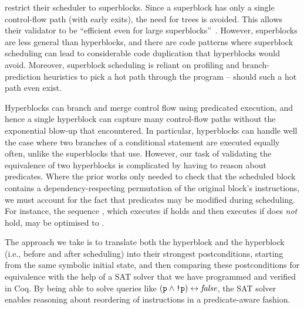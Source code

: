 \citeauthor{six22_formal_verif_super_sched} restrict their scheduler to superblocks. Since a superblock has only a single control-flow path (with early exits), the need for trees is avoided. This allows their validator to be ``efficient even for large superblocks''~\cite[p.~53]{six22_formal_verif_super_sched}. However, superblocks are less general than hyperblocks, and there are code patterns where superblock scheduling can lead to considerable code duplication that hyperblocks would avoid. Moreover, superblock scheduling is reliant on profiling and branch-prediction heuristics to pick a hot path through the program -- should such a hot path even exist.

Hyperblocks can branch and merge control flow using predicated execution, and
hence a single hyperblock can capture many control-flow paths without the
exponential blow-up that \citeauthor{tristan08_formal_verif_trans_valid}
encountered.  In particular, hyperblocks can handle well the case where two
branches of a conditional statement are executed equally often, unlike the
superblocks that \citeauthor{six22_formal_verif_super_sched} use. However, our
task of validating the equivalence of two hyperblocks is complicated by having
to reason about predicates. Where the prior works only needed to check that the
scheduled block contains a dependency-respecting permutation of the original
block's instructions, we must account for the fact that predicates may be
modified during scheduling. For instance, the sequence , which executes  if  holds and then executes  if  does \emph{not} hold, may be
optimised to .

The approach we take is to translate both the \rtlblock{} hyperblock
and the \rtlpar{} hyperblock (i.e., before and after scheduling) into their strongest postconditions, starting from the same symbolic initial state, and then comparing these postconditions for equivalence with the help of a SAT solver that we have programmed and verified in Coq. By being able to solve queries like $(\texttt{p} \land \texttt{!p}) \leftrightarrow \mathit{false}$, the SAT solver enables reasoning about reordering of instructions in a predicate-aware fashion.


